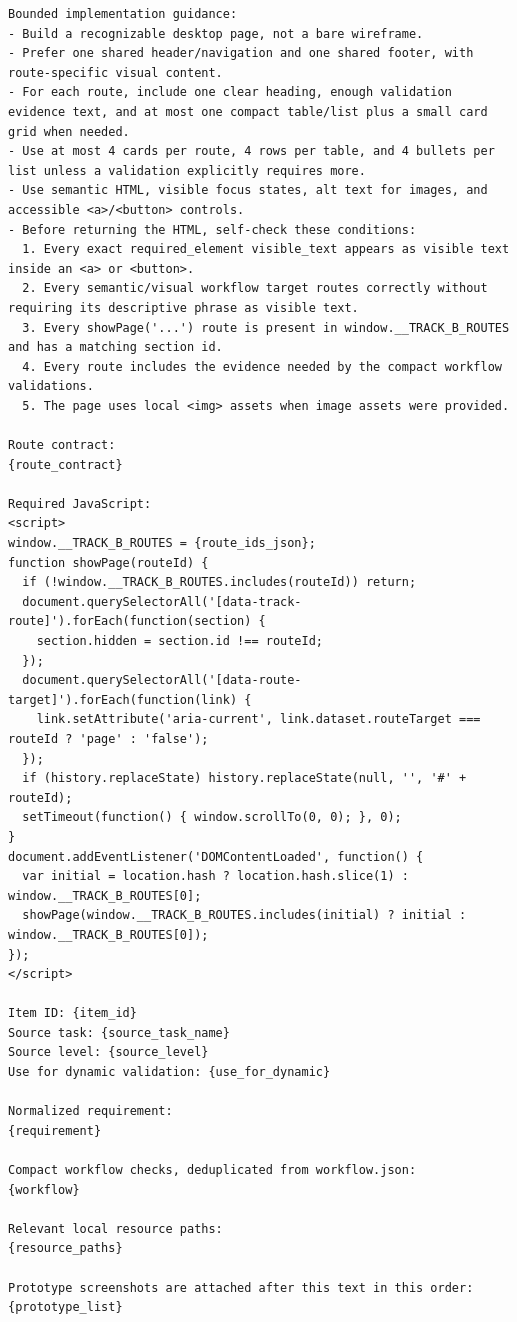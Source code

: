 \begin{verbatim}
Bounded implementation guidance:
- Build a recognizable desktop page, not a bare wireframe.
- Prefer one shared header/navigation and one shared footer, with route-specific visual content.
- For each route, include one clear heading, enough validation evidence text, and at most one compact table/list plus a small card grid when needed.
- Use at most 4 cards per route, 4 rows per table, and 4 bullets per list unless a validation explicitly requires more.
- Use semantic HTML, visible focus states, alt text for images, and accessible <a>/<button> controls.
- Before returning the HTML, self-check these conditions:
  1. Every exact required_element visible_text appears as visible text inside an <a> or <button>.
  2. Every semantic/visual workflow target routes correctly without requiring its descriptive phrase as visible text.
  3. Every showPage('...') route is present in window.__TRACK_B_ROUTES and has a matching section id.
  4. Every route includes the evidence needed by the compact workflow validations.
  5. The page uses local <img> assets when image assets were provided.

Route contract:
{route_contract}

Required JavaScript:
<script>
window.__TRACK_B_ROUTES = {route_ids_json};
function showPage(routeId) {
  if (!window.__TRACK_B_ROUTES.includes(routeId)) return;
  document.querySelectorAll('[data-track-route]').forEach(function(section) {
    section.hidden = section.id !== routeId;
  });
  document.querySelectorAll('[data-route-target]').forEach(function(link) {
    link.setAttribute('aria-current', link.dataset.routeTarget === routeId ? 'page' : 'false');
  });
  if (history.replaceState) history.replaceState(null, '', '#' + routeId);
  setTimeout(function() { window.scrollTo(0, 0); }, 0);
}
document.addEventListener('DOMContentLoaded', function() {
  var initial = location.hash ? location.hash.slice(1) : window.__TRACK_B_ROUTES[0];
  showPage(window.__TRACK_B_ROUTES.includes(initial) ? initial : window.__TRACK_B_ROUTES[0]);
});
</script>

Item ID: {item_id}
Source task: {source_task_name}
Source level: {source_level}
Use for dynamic validation: {use_for_dynamic}

Normalized requirement:
{requirement}

Compact workflow checks, deduplicated from workflow.json:
{workflow}

Relevant local resource paths:
{resource_paths}

Prototype screenshots are attached after this text in this order:
{prototype_list}
\end{verbatim}
\endgroup

